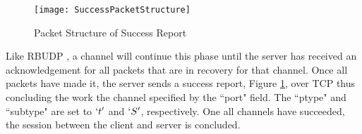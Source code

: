 \begin{figure}[ht]
\centering
\texttt{[image: SuccessPacketStructure]}
\caption{Packet Structure of Success Report}
\label{fig:success-struct}
\end{figure}

Like RBUDP \cite{He2002}, a channel will continue this phase until the server has received an acknowledgement for all packets that are in recovery for that channel. Once all packets have made it, the server sends a success report, Figure \ref{fig:success-struct}, over TCP thus concluding the work the channel specified by the ``port" field. The ``ptype" and ``subtype" are set to $`t'$ and $`S'$, respectively. One all channels have succeeded, the session between the client and server is concluded.